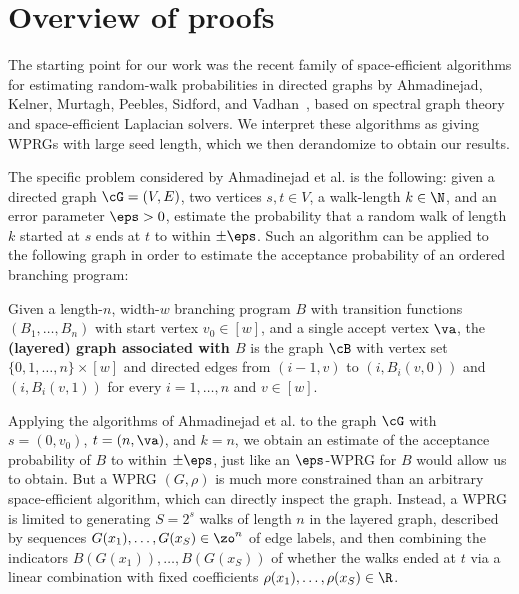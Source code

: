\documentclass{toc}
\begin{document}
\section{Overview of proofs}
The starting point for our %
%
work was %
the recent
family of %
%
%
space-efficient algorithms for estimating
random-walk probabilities in directed graphs by
%
Ahmadinejad, %
Kelner, Murtagh,
Peebles, Sidford, and Vadhan~\cite{AhmadinejadKeMuPeSiVa19}, %
%
based on spectral graph
theory and space-efficient Laplacian solvers. 
    We interpret these algorithms as giving WPRGs with large seed length, which we then derandomize to obtain our results.  
    
    The specific problem considered by %
Ahmadinejad  %
et al. is the following: given a directed graph $\cG=(V,E)$, two vertices $s,t\in V$, a walk-length $k\in \N$, and an error parameter $\eps>0$, estimate the probability that a random walk of length $k$ started at $s$ ends at $t$ to within $\pm \eps$.  Such an algorithm can be applied to the following graph in order to estimate the acceptance probability of an ordered branching program:
    \begin{definition} \label{def:OBP_graph}
%
Given a length-$n$, width-$w$    %
branching program $B$ with transition functions $(B_1,\ldots,B_n)$ with start vertex $v_0\in [w]$, and a single accept vertex $\va$, the \textbf{(layered) graph associated with $B$} is the graph $\cB$ with vertex set $\{0,1,\ldots,n\}\times[w]$ and directed edges from $(i-1,v)$ to
        $(i,B_i(v,0))$ and $(i,B_i(v,1))$ for every $i=1,\ldots,n$ and $v\in [w]$.
    \end{definition} 
    Applying the algorithms of %
Ahmadinejad  %
et al. to the graph $\cG$ with $s=(0,v_0)$, $t=(n,\va)$, and $k=n$, we obtain an estimate of the acceptance probability of $B$ to within $\pm \eps$, just like an $\eps$-WPRG for $B$ would allow us to obtain. But a WPRG $(G,\rho)$ is much more constrained than an arbitrary space-efficient algorithm, which can directly inspect the graph. Instead, a WPRG is limited to generating $S=2^s$ walks of length $n$ in the layered graph, described by sequences $G(x_1),\ldots, G(x_S)\in \zo^n$ of edge labels, and then combining the indicators $B(G(x_1)),\ldots,B(G(x_S))$ of whether the walks ended at $t$ via a linear combination with fixed coefficients $\rho(x_1),\ldots,\rho(x_S)\in \R$.
    
\end{document}
